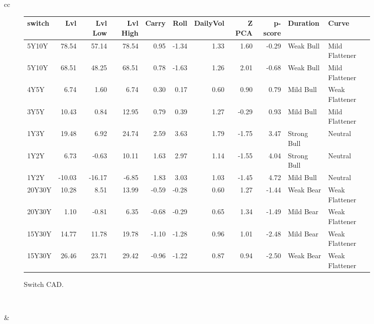 \documentclass[a4paper,twoside]{report}
\begin{document}
\begin{figure}[htbp]
\begin{tabular}[c]{cc}
\begin{subfigure}[c]{0.5\textwidth}
\caption{Switch CAD.}
\label{fig:Switch CAD}
\begin{adjustbox}{max width=\textwidth}
\begin{tabular}{lrrrrrrrrll}
\hline
 switch &    Lvl &  Lvl Low &  Lvl High &  Carry &  Roll &  DailyVol &  Z PCA &  p-score &     Duration &           Curve \\
\hline
  5Y10Y &  78.54 &    57.14 &     78.54 &   0.95 & -1.34 &      1.33 &   1.60 &    -0.29 &    Weak Bull &  Mild Flattener \\
  5Y10Y &  68.51 &    48.25 &     68.51 &   0.78 & -1.63 &      1.26 &   2.01 &    -0.68 &    Weak Bull &  Mild Flattener \\
   4Y5Y &   6.74 &     1.60 &      6.74 &   0.30 &  0.17 &      0.60 &   0.90 &     0.79 &    Mild Bull &  Weak Flattener \\
   3Y5Y &  10.43 &     0.84 &     12.95 &   0.79 &  0.39 &      1.27 &  -0.29 &     0.93 &    Mild Bull &  Mild Flattener \\
   1Y3Y &  19.48 &     6.92 &     24.74 &   2.59 &  3.63 &      1.79 &  -1.75 &     3.47 &  Strong Bull &         Neutral \\
   1Y2Y &   6.73 &    -0.63 &     10.11 &   1.63 &  2.97 &      1.14 &  -1.55 &     4.04 &  Strong Bull &         Neutral \\
   1Y2Y & -10.03 &   -16.17 &     -6.85 &   1.83 &  3.03 &      1.03 &  -1.45 &     4.72 &    Mild Bull &         Neutral \\
 20Y30Y &  10.28 &     8.51 &     13.99 &  -0.59 & -0.28 &      0.60 &   1.27 &    -1.44 &    Weak Bear &  Weak Flattener \\
 20Y30Y &   1.10 &    -0.81 &      6.35 &  -0.68 & -0.29 &      0.65 &   1.34 &    -1.49 &    Mild Bear &  Weak Flattener \\
 15Y30Y &  14.77 &    11.78 &     19.78 &  -1.10 & -1.28 &      0.96 &   1.01 &    -2.48 &    Mild Bear &  Weak Flattener \\
 15Y30Y &  26.46 &    23.71 &     29.42 &  -0.96 & -1.22 &      0.87 &   0.94 &    -2.50 &    Weak Bear &  Weak Flattener \\
\hline
\end{tabular}
\end{adjustbox}
 \end{subfigure}\\
 
 
\begin{subfigure}[c]{0.5\textwidth}
 
 \end{subfigure}&
 

\end{tabular}
\end{figure}
\end{document}
